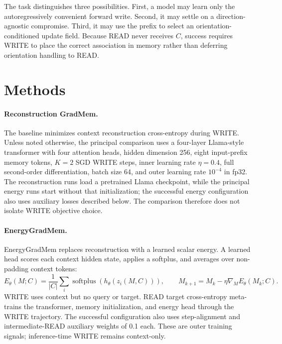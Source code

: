 \documentclass{article}
\newcommand{\egm}{EnergyGradMem}
\newcommand{\gm}{GradMem}
\begin{document}
The task distinguishes three possibilities.  First, a model may learn only the autoregressively convenient forward write.  Second, it may settle on a direction-agnostic compromise.  Third, it may use the prefix to select an orientation-conditioned update field.  Because READ never receives $C$, success requires WRITE to place the correct association in memory rather than deferring orientation handling to READ.

\section{Methods}
\label{sec:methods}

\paragraph{Reconstruction \gm.}
The baseline minimizes context reconstruction cross-entropy during WRITE.  Unless noted otherwise, the principal comparison uses a four-layer Llama-style transformer with four attention heads, hidden dimension 256, eight input-prefix memory tokens, $K=2$ SGD WRITE steps, inner learning rate $\eta=0.4$, full second-order differentiation, batch size 64, and outer learning rate $10^{-4}$ in fp32.  The reconstruction runs load a pretrained Llama checkpoint, while the principal energy runs start without that initialization; the successful energy configuration also uses auxiliary losses described below.  The comparison therefore does not isolate WRITE objective choice.

\paragraph{EnergyGradMem.}
\egm{} replaces reconstruction with a learned scalar energy.  A learned head scores each context hidden state, applies a softplus, and averages over non-padding context tokens:
\begin{equation}
  E_\theta(M;C)=\frac{1}{|C|}\sum_i
  \operatorname{softplus}\!\left(h_\theta(z_i(M,C))\right),
  \qquad M_{k+1}=M_k-\eta\nabla_M E_\theta(M_k;C).
\end{equation}
WRITE uses context but no query or target.  READ target cross-entropy meta-trains the transformer, memory initialization, and energy head through the WRITE trajectory.  The successful configuration also uses step-alignment and intermediate-READ auxiliary weights of 0.1 each.  These are outer training signals; inference-time WRITE remains context-only.
\end{document}
